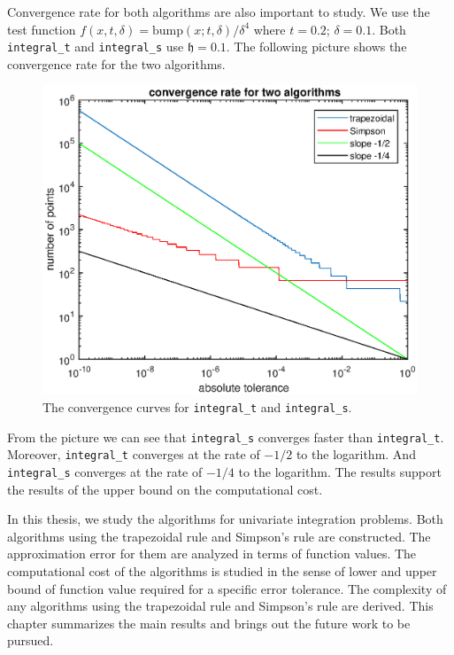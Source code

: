 \documentclass{iitthesis}
\theoremstyle{definition}
\theoremstyle{remark}
\begin{document}
Convergence rate for both algorithms are also important to study. We use the test function $f(x,t,\delta)= \text{bump}(x;t,\delta)/\delta^{4}$ where $t=0.2$; $\delta=0.1$. Both {\tt integral\_t} and {\tt integral\_s} use $\mathfrak{h}=0.1$. The following picture shows the convergence rate for the two algorithms.
\begin{figure}[ht]
\centering
\includegraphics[width=12.5cm]{converwithslope.eps}
\caption{The convergence curves for {\tt integral\_t} and {\tt integral\_s}. \label{fig:convergencerate}}
\end{figure}

From the picture we can see that {\tt integral\_s} converges faster than {\tt integral\_t}. Moreover, {\tt integral\_t} converges at the rate of $-1/2$ to the logarithm. And {\tt integral\_s} converges at the rate of $-1/4$ to the logarithm. The results support the results of the upper bound on the computational cost.



In this thesis, we study the algorithms for univariate integration problems. Both algorithms using the trapezoidal rule and Simpson's rule are constructed. The approximation error for them are analyzed in terms of function values. The computational cost of the algorithms is studied in the sense of lower and upper bound of function value required for a specific error tolerance. The complexity of any algorithms using the trapezoidal rule and Simpson's rule are derived. This chapter summarizes the main results and brings out the future work to be pursued.
\end{document}
